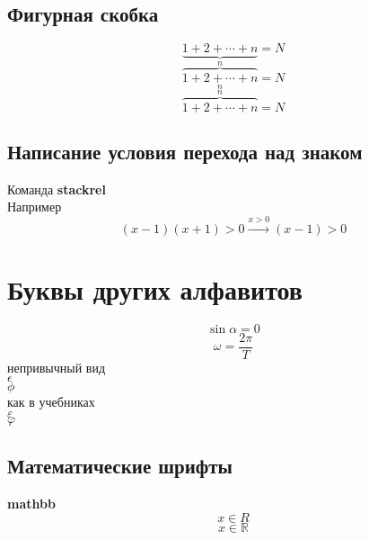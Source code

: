 \documentclass[a4paper,14pt]{article} %
\begin{document}
\subsection{Фигурная скобка}
\[\underbrace{1+2+\cdots+n}_{n} = N\]
\[\overbrace{1+2+\cdots+n}_{n} = N\]
\[\overbrace{1+2+\cdots+n}^{n} = N\]
\subsection{Написание условия перехода над знаком}
Команда \textbf{stackrel}\\
Например\\
\[(x-1)(x+1)>0 \stackrel{x>0}{\longrightarrow}(x-1)>0\]
\section{Буквы других алфавитов}
\[\sin \alpha=0\]
\[\omega=\frac{2\pi}{T}\]
непривычный вид \\
$\epsilon$ \\
$\phi$ \\
как в учебниках \\
$\varepsilon$ \\
$\varphi$
\subsection{Математические шрифты}
\textbf{mathbb}
\[x \in R\]
\[x \in \mathbb{R}\]
\end{document}
